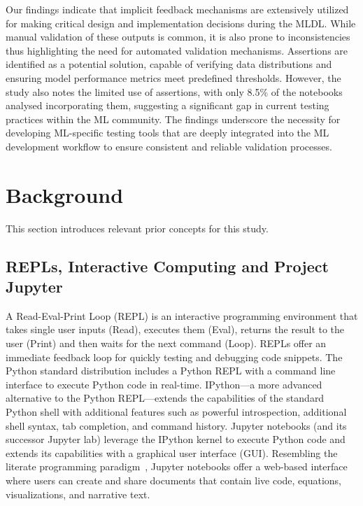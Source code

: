 \documentclass[smallextended]{svjour3}       %
\begin{document}
Our findings indicate that implicit feedback mechanisms are extensively utilized for making critical design and implementation decisions during the MLDL. While manual validation of these outputs is common, it is also prone to inconsistencies thus highlighting the need for automated validation mechanisms. Assertions are identified as a potential solution, capable of verifying data distributions and ensuring model performance metrics meet predefined thresholds. However, the study also notes the limited use of assertions, with only 8.5\% of the notebooks analysed incorporating them, suggesting a significant gap in current testing practices within the ML community. The findings underscore the necessity for developing ML-specific testing tools that are deeply integrated into the ML development workflow to ensure consistent and reliable validation processes.

\section{Background}\label{sec:background}

This section introduces relevant prior concepts for this study.

\subsection{REPLs, Interactive Computing and Project Jupyter}

A Read-Eval-Print Loop (REPL) is an interactive programming environment that takes single user inputs (Read), executes them (Eval), returns the result to the user (Print) and then waits for the next command (Loop). REPLs offer an immediate feedback loop for quickly testing and debugging code snippets. The Python standard distribution includes a Python REPL with a command line interface to execute Python code in real-time. IPython---a more advanced alternative to the Python REPL---extends the capabilities of the standard Python shell with additional features such as powerful introspection, additional shell syntax, tab completion, and command history. Jupyter notebooks (and its successor Jupyter lab) leverage the IPython kernel to execute Python code and extends its capabilities with a graphical user interface (GUI). Resembling the literate programming paradigm~\citep{knuth1984literate}, Jupyter notebooks offer a web-based interface where users can create and share documents that contain live code, equations, visualizations, and narrative text.
\end{document}

